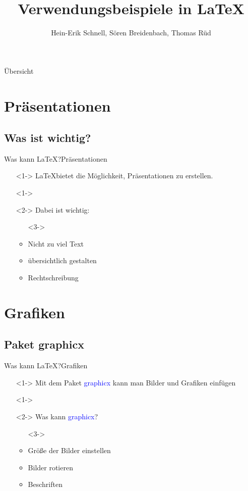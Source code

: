 \documentclass{beamer}
\begin{document}
\title{Verwendungsbeispiele in \LaTeX}
\author{Hein-Erik Schnell, Sören Breidenbach, Thomas Rüd}

\frame{\titlepage}

\begin{frame}{Übersicht}
  \tableofcontents
\end{frame}

\section{Präsentationen}
\subsection{Was ist wichtig?}

\begin{frame}{Was kann \LaTeX?}{Präsentationen}
  \begin{itemize}
    \item[]<1-> \LaTeX bietet die Möglichkeit, Präsentationen zu erstellen.
    \item[]<1->
    \item[]<2-> Dabei ist wichtig:
      \begin{itemize}
        \item[]<3->
        \item<3-> Nicht zu viel Text
        \item<4-> übersichtlich gestalten
        \item<5-> Rechtschreibung
      \end{itemize}
  \end{itemize}
\end{frame}

\section{Grafiken}
\subsection{Paket graphicx}

\begin{frame}{Was kann \LaTeX?}{Grafiken}
  \begin{itemize}
    \item[]<1-> Mit dem Paket \textcolor{blue}{graphicx} kann man Bilder und
       Grafiken einfügen
    \item[]<1->
    \item[]<2-> Was kann \textcolor{blue}{graphicx}?
      \begin{itemize}
        \item[]<3->
        \item<3-> Größe der Bilder einstellen
        \item<4-> Bilder rotieren
        \item<5-> Beschriften
      \end{itemize}
  \end{itemize}

\end{frame}
\end{document}
